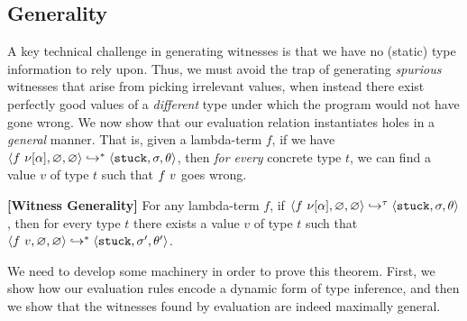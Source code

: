 


\subsection{Generality}\label{sec:soundness}

A key technical challenge in generating witnesses is
that we have no (static) type information to rely upon.
%
Thus, we must avoid the trap of generating \emph{spurious}
witnesses that arise from picking irrelevant values, when
instead there exist perfectly good values of a \emph{different}
type under which the program would not have gone wrong.
%
We now show that our evaluation relation instantiates holes
in a \emph{general} manner. That is, given a lambda-term $f$,
if we have $\langle f\ \nu[\alpha], \varnothing, \varnothing \rangle \hookrightarrow^{*} \langle \mathtt{stuck}, \sigma, \theta \rangle{}$,
then \emph{for every} concrete type $t$, we can find a value
$v$ of type $t$ such that $f\ v$ goes wrong.

\begin{thm}{\textbf{[Witness Generality]}}
\label{thm:soundness}
  For any lambda-term $f$, if
  \hbox{$\langle f\ \nu[\alpha], \varnothing, \varnothing \rangle \hookrightarrow^{\tau} \langle \mathtt{stuck}, \sigma, \theta \rangle$,}
  then for every %
  type
  $t$ there exists a value $v$ of type $t$ such that
  $\langle f\ v, \varnothing, \varnothing \rangle \hookrightarrow^{*} \langle \mathtt{stuck}, \sigma', \theta' \rangle{}$.
\end{thm}

We need to develop some machinery in order to prove this theorem.
First, we show how our evaluation rules encode a dynamic form of
type inference, and then we show that the witnesses found by
evaluation are indeed maximally general.

